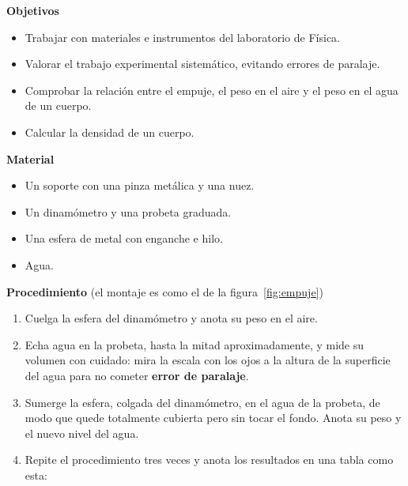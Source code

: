 \noindent\begin{minipage}[t]{0.53\textwidth}
    \textbf{Objetivos}
    \begin{itemize}
        \item Trabajar con materiales e instrumentos del laboratorio de Física.
        \item Valorar el trabajo experimental sistemático, evitando errores de paralaje.
        \item Comprobar la relación entre el empuje, el peso en el aire y el peso en el agua de un cuerpo.
        \item Calcular la densidad de un cuerpo.
    \end{itemize}
\end{minipage}\hfill
\begin{minipage}[t]{0.43\textwidth}
    \textbf{Material}
    \begin{itemize}
        \item Un soporte con una pinza metálica y una nuez.
        \item Un dinamómetro y una probeta graduada.
        \item Una esfera de metal con enganche e hilo.
        \item Agua.
    \end{itemize}
\end{minipage}

\medskip

\textbf{Procedimiento} (el montaje es como el de la figura~\ref{fig:empuje})
\begin{enumerate}[label=\numberballgreen]
    \item Cuelga la esfera del dinamómetro y anota su peso en el aire.
    \item Echa agua en la probeta, hasta la mitad aproximadamente, y mide su volumen con cuidado: mira la escala con los ojos a la altura de la superficie del agua para no cometer \textbf{error de paralaje}.
    \item Sumerge la esfera, colgada del dinamómetro, en el agua de la probeta, de modo que quede totalmente cubierta pero sin tocar el fondo. Anota su peso y el nuevo nivel del agua.
    \item Repite el procedimiento tres veces y anota los resultados en una tabla como esta:
\end{enumerate}

